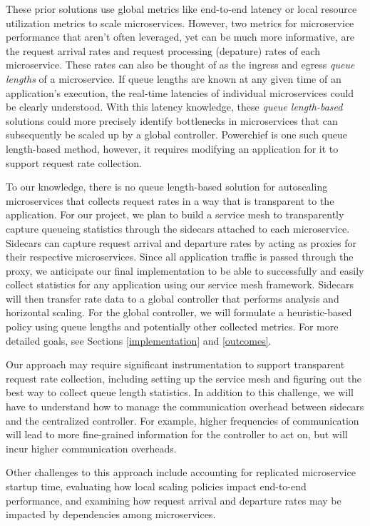 \documentclass{proposal}
\begin{document}
These prior solutions use global metrics like end-to-end latency or local resource utilization metrics to scale microservices. However, two metrics for microservice performance that aren't often leveraged, yet can be much more informative, are the request arrival rates and request processing (depature) rates of each microservice. These rates can also be thought of as the ingress and egress \textit{queue lengths} of a microservice. If queue lengths are known at any given time of an application's execution, the real-time latencies of individual microservices could be clearly understood. With this latency knowledge, these \textit{queue length-based} solutions could more precisely identify bottlenecks in microservices that can subsequently be scaled up by a global controller. Powerchief is one such queue length-based method, however, it requires modifying an application for it to support request rate collection.

To our knowledge, there is no queue length-based solution for autoscaling microservices that collects request rates in a way that is transparent to the application. For our project, we plan to build a service mesh to transparently capture queueing statistics through the sidecars attached to each microservice. Sidecars can capture request arrival and departure rates by acting as proxies for their respective microservices. Since all application traffic is passed through the proxy, we anticipate our final implementation to be able to successfully and easily collect statistics for any application using our service mesh framework. Sidecars will then transfer rate data to a global controller that performs analysis and horizontal scaling. For the global controller, we will formulate a heuristic-based policy using queue lengths and potentially other collected metrics. For more detailed goals, see Sections \ref{implementation} and \ref{outcomes}.

Our approach may require significant instrumentation to support transparent request rate collection, including setting up the service mesh and figuring out the best way to collect queue length statistics. In addition to this challenge, we will have to understand how to manage the communication overhead between sidecars and the centralized controller. For example, higher frequencies of communication will lead to more fine-grained information for the controller to act on, but will incur higher communication overheads.

Other challenges to this approach include accounting for replicated microservice startup time, evaluating how local scaling policies impact end-to-end performance, and examining how request arrival and departure rates may be impacted by dependencies among microservices.
\end{document}
